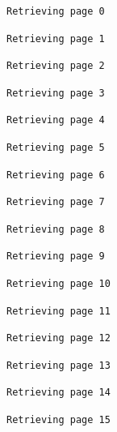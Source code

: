 \documentclass[
  letterpaper,
  DIV=11,
  numbers=noendperiod]{scrartcl}
\begin{document}
\begin{verbatim}
Retrieving page 0
\end{verbatim}

\begin{verbatim}
Retrieving page 1
\end{verbatim}

\begin{verbatim}
Retrieving page 2
\end{verbatim}

\begin{verbatim}
Retrieving page 3
\end{verbatim}

\begin{verbatim}
Retrieving page 4
\end{verbatim}

\begin{verbatim}
Retrieving page 5
\end{verbatim}

\begin{verbatim}
Retrieving page 6
\end{verbatim}

\begin{verbatim}
Retrieving page 7
\end{verbatim}

\begin{verbatim}
Retrieving page 8
\end{verbatim}

\begin{verbatim}
Retrieving page 9
\end{verbatim}

\begin{verbatim}
Retrieving page 10
\end{verbatim}

\begin{verbatim}
Retrieving page 11
\end{verbatim}

\begin{verbatim}
Retrieving page 12
\end{verbatim}

\begin{verbatim}
Retrieving page 13
\end{verbatim}

\begin{verbatim}
Retrieving page 14
\end{verbatim}

\begin{verbatim}
Retrieving page 15
\end{verbatim}
\end{document}
